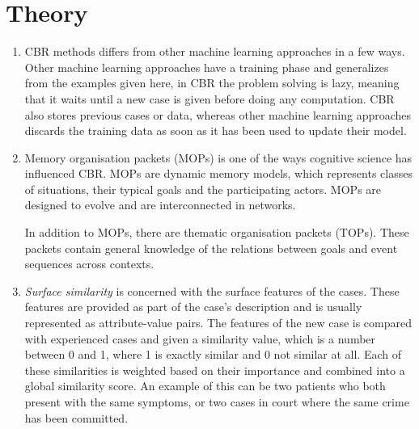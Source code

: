 \documentclass[a4paper]{article}
\begin{document}
\newlength{\itemizewidth}%
\setlength{\itemizewidth}{\dimexpr\linewidth-\leftmargini\relax}
\section{Theory}
\begin{enumerate}
    \item
        CBR methods differs from other machine learning approaches in a few
        ways. Other machine learning approaches have a training phase and
        generalizes from the examples given here, in CBR the problem solving is
        lazy, meaning that it waits until a new case is given before doing any
        computation. CBR also stores previous cases or data, whereas other
        machine learning approaches discards the training data as soon as it has
        been used to update their model. 
    \item
        Memory organisation packets (MOPs) is one of the ways cognitive science
        has influenced CBR. MOPs are dynamic memory models, which represents
        classes of situations, their typical goals and the participating actors.
        MOPs are designed to evolve and are interconnected in networks.

        In addition to MOPs, there are thematic organisation packets (TOPs).
        These packets contain general knowledge of the relations between goals
        and event sequences across contexts.
    \item
        \emph{Surface similarity} is concerned with the surface features of the
        cases. These features are provided as part of the case's description and
        is usually represented as attribute-value pairs. The features of the new
        case is compared with experienced cases and given a similarity value,
        which is a number between 0 and 1, where 1 is exactly similar and 0 not
        similar at all. Each of these similarities is weighted based on their
        importance and combined into a global similarity score. An example of
        this can be two patients who both present with the same symptoms, or two
        cases in court where the same crime has been committed.
   

\end{enumerate}
\end{document}
